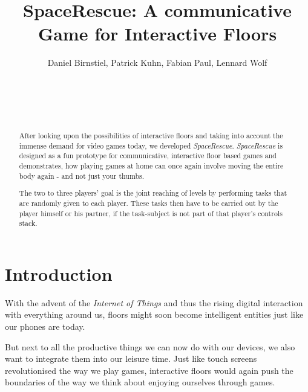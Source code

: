 \documentclass{sigchi}
\begin{document}
\title{SpaceRescue: A communicative Game for Interactive Floors}

\author{
  \alignauthor Daniel Birnstiel, Patrick Kuhn, Fabian Paul, Lennard Wolf\\
      \medskip
    \\
    \\
    \\
    \\
}

\maketitle

\begin{abstract}
\vspace{1mm}
After looking upon the possibilities of interactive floors and taking into account the immense demand for video games today, we developed \textit{SpaceRescue}. \textit{SpaceRescue} is designed as a fun prototype for communicative, interactive floor based games and demonstrates, how playing games at home can once again involve moving the entire body
again - and not just your thumbs.


The two to three players' goal is the joint reaching of levels by performing tasks that are randomly given to each player. These tasks  then have to be carried out by the player himself or his partner, if the task-subject is not part of that player's controls stack. 

\end{abstract}


\section{Introduction}
\vspace{1mm}
With the advent of the \textit{Internet of Things} and thus the rising digital interaction with everything around us, floors might soon become intelligent entities just like our phones are today. 

But next to all the productive things we can now do with our devices, we also want to integrate them into our leisure time. Just like touch screens revolutionised the way we play games, interactive floors would again push the boundaries of the way we think about enjoying ourselves through games.
\end{document}
